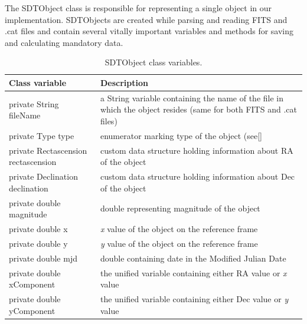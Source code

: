 	The SDTObject class is responsible for representing a single object in our implementation. SDTObjects are created while parsing and reading FITS and .cat files and contain several vitally important variables and methods for saving and calculating mandatory data.
	
\begin{table}[H]
\centering
\setlength{\extrarowheight}{2pt}
\begin{tabularx}{\textwidth}{|X|X|}
\hline
\textbf{Class variable} & \textbf{Description} \\ \hline
private String \mbox{fileName} & a String variable containing the name of the file in which the object resides (same for both FITS and .cat files) \\ \hline
private Type \mbox{type} & enumerator marking type of the object (see\ref{} \\ \hline
private \mbox{Rectascension} \mbox{rectascension} & custom data structure holding information about RA of the object \\ \hline
private \mbox{Declination} \mbox{declination} & custom data structure holding information about Dec of the object \\ \hline
private double \mbox{magnitude} & double representing magnitude of the object \\ \hline
private double \mbox{x} & \emph{x} value of the object on the reference frame \\ \hline
private double \mbox{y} & \emph{y} value of the object on the reference frame \\ \hline
private double \mbox{mjd} & double containing date in the Modified Julian Date \\ \hline
private double \mbox{xComponent} & the unified variable containing either RA value or \emph{x} value \\ \hline
private double \mbox{yComponent} & the unified variable containing either Dec value or \emph{y} value \\ \hline
\end{tabularx}
\caption{SDTObject class variables.}
\label{tab:class_variables_O}
\end{table}

